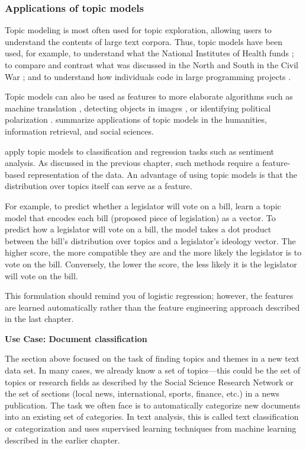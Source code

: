 \documentclass[]{krantz}
\begin{document}
\subsubsection{Applications of topic
models}\label{applications-of-topic-models}

Topic modeling is most often used for topic exploration, allowing users
to understand the contents of large text corpora. Thus, topic models
have been used, for example, to understand what the National Institutes
of Health funds \citep{talley2011database}; to compare and contrast what
was discussed in the North and South in the Civil War \citep{nelson-10};
and to understand how individuals code in large programming projects
\citep{maskeri-08}.

Topic models can also be used as features to more elaborate algorithms
such as machine translation \citep{Hu:Zhai:Eidelman:Boyd-Graber-2014},
detecting objects in images \citep{wang-09b}, or identifying political
polarization \citep{paul-10}. \citet{boyd-graber-17} summarize
applications of topic models in the humanities, information retrieval,
and social sciences.

\citet{blei-07b} apply topic models to classification and regression
tasks such as sentiment analysis. As discussed in the previous chapter,
such methods require a feature-based representation of the data. An
advantage of using topic models is that the distribution over topics
itself can serve as a feature.

For example, to predict whether a legislator will vote on a bill,
\citet{gerrish-12} learn a topic model that encodes each bill (proposed
piece of legislation) as a vector. To predict how a legislator will vote
on a bill, the model takes a dot product between the bill's distribution
over topics and a legislator's ideology vector. The higher score, the
more compatible they are and the more likely the legislator is to vote
on the bill. Conversely, the lower the score, the less likely it is the
legislator will vote on the bill.

This formulation should remind you of logistic regression; however, the
features are learned automatically rather than the feature engineering
approach described in the last chapter.

\textbf{Use Case: Document classification}

The section above focused on the task of finding topics and themes in a
new text data set. In many cases, we already know a set of topics---this
could be the set of topics or research fields as described by the Social
Science Research Network or the set of sections (local news,
international, sports, finance, etc.) in a news publication. The task we
often face is to automatically categorize new documents into an existing
set of categories. In text analysis, this is called text classification
or categorization and uses supervised learning techniques from machine
learning described in the earlier chapter.
\end{document}
